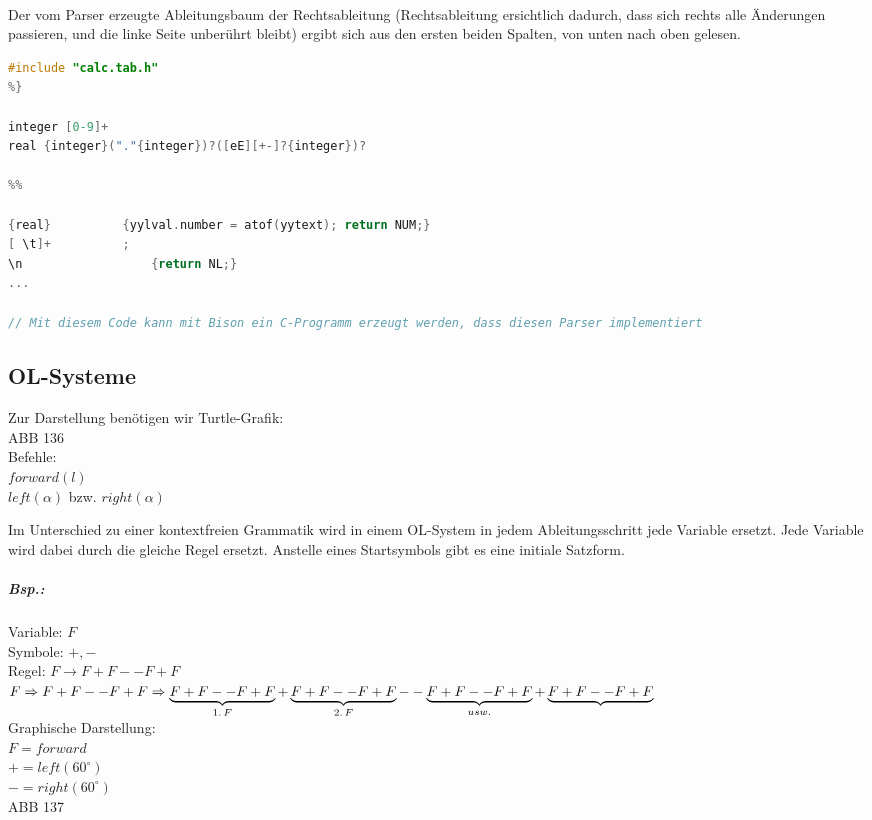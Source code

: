 \\
Der vom Parser erzeugte Ableitungsbaum der Rechtsableitung (Rechtsableitung ersichtlich dadurch, dass sich rechts alle Änderungen passieren, und die linke Seite unberührt bleibt) ergibt sich aus den ersten beiden Spalten, von unten nach oben gelesen.
\begin{lstlisting}[language=C]
%{
#include "calc.tab.h"
%}

integer [0-9]+
real {integer}("."{integer})?([eE][+-]?{integer})?

%%

{real}			{yylval.number = atof(yytext); return NUM;}
[ \t]+			;
\n					{return NL;}
...

// Mit diesem Code kann mit Bison ein C-Programm erzeugt werden, dass diesen Parser implementiert
\end{lstlisting}


\subsection{OL-Systeme}
Zur Darstellung benötigen wir Turtle-Grafik:\\
ABB 136\\
Befehle:\\
$forward (l)$ \\
$left (\alpha)$ bzw. $right(\alpha)$

Im Unterschied zu einer kontextfreien Grammatik wird in einem OL-System in jedem Ableitungsschritt jede Variable ersetzt. Jede Variable wird dabei durch die gleiche Regel ersetzt. Anstelle eines Startsymbols gibt es eine initiale Satzform.
\subparagraph{Bsp.:} \parskp
Variable: $F$\\
Symbole: $+,-$\\
Regel: $F\to F+F--F+F$\\
$F\Rightarrow F+F --F + F \\
\Rightarrow \underbrace{F + F -- F + F}_{1.\,F} + \underbrace{F + F -- F + F}_{2.\,F} -- \underbrace{F + F -- F + F}_{usw.} + \underbrace{F + F -- F + F}$\\
Graphische Darstellung:\\
$F= forward$\\
$+=left(60^\circ)$\\
$-=right(60^\circ)$\\
ABB 137
